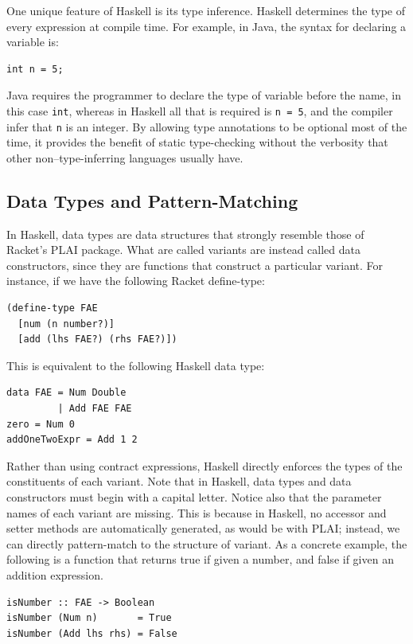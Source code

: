 \documentclass[format=acmlarge, review=false, nonacm=false, screen=true]{acmart}
\begin{document}
One unique feature of Haskell is its type inference. Haskell determines the type of every expression at compile time. For example, in Java, the syntax for declaring a variable is:
\begin{verbatim}
int n = 5;
\end{verbatim}
Java requires the programmer to declare the type of variable before the name, in this case \texttt{int}, whereas in Haskell all that is required is \texttt{n = 5}, and the compiler infer that \texttt{n} is an integer. By allowing type annotations to be optional most of the time, it provides the benefit of static type-checking without the verbosity that other non--type-inferring languages usually have.

\subsection{Data Types and Pattern-Matching}
In Haskell, data types are data structures that strongly resemble those of Racket's PLAI package. What are called variants are instead called data constructors, since they are functions that construct a particular variant. For instance, if we have the following Racket define-type:

\begin{verbatim}
(define-type FAE    
  [num (n number?)] 
  [add (lhs FAE?) (rhs FAE?)])
\end{verbatim}

This is equivalent to the following Haskell data type:

\begin{verbatim}
data FAE = Num Double
         | Add FAE FAE
zero = Num 0
addOneTwoExpr = Add 1 2
\end{verbatim}

Rather than using contract expressions, Haskell directly enforces the types of the constituents of each variant. Note that in Haskell, data types and data constructors must begin with a capital letter. Notice also that the parameter names of each variant are missing. This is because in Haskell, no accessor and setter methods are automatically generated, as would be with PLAI; instead, we can directly pattern-match to the structure of variant. As a concrete example, the following is a function that returns true if given a number, and false if given an addition expression.

\begin{verbatim}
isNumber :: FAE -> Boolean
isNumber (Num n)       = True
isNumber (Add lhs rhs) = False
\end{verbatim}
\end{document}

